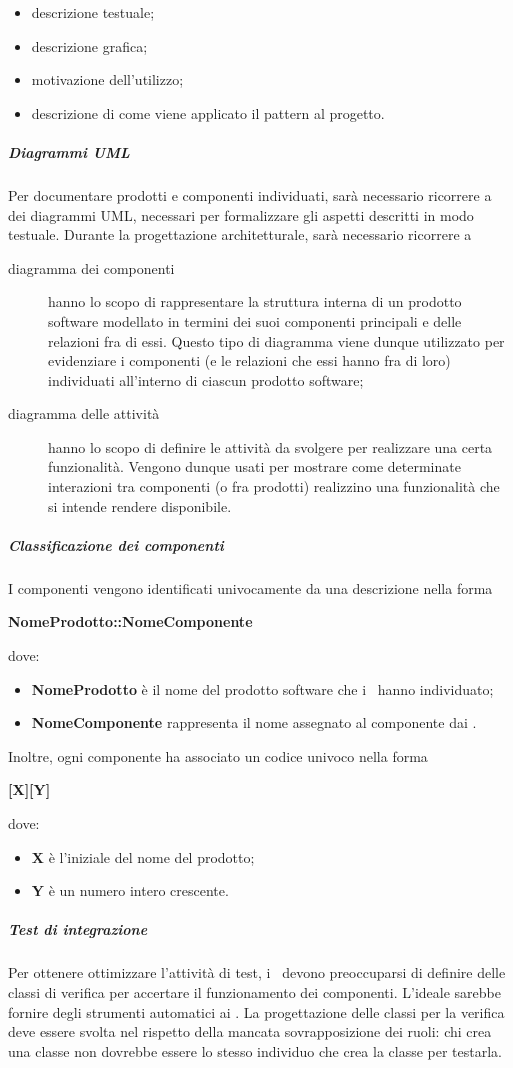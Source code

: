 \documentclass[../NormeProgetto.tex]{subfiles}
\begin{document}
				\begin{itemize}
					\item descrizione testuale;
					\item descrizione grafica;
					\item motivazione dell'utilizzo;
					\item descrizione di come viene applicato il pattern al progetto.
				\end{itemize}
			\subparagraph{Diagrammi UML}
				Per documentare prodotti e componenti individuati, sarà necessario ricorrere a dei diagrammi UML, necessari per formalizzare gli aspetti descritti in modo testuale. Durante la progettazione architetturale, sarà necessario ricorrere a 
				\begin{description}
					\item[diagramma dei componenti]  hanno lo scopo di rappresentare la struttura interna di un prodotto software modellato in termini dei suoi componenti principali e delle relazioni fra di essi. Questo tipo di diagramma viene dunque utilizzato per evidenziare i componenti (e le relazioni che essi hanno fra di loro) individuati all'interno di ciascun prodotto software;
					\item[diagramma delle attività]  hanno lo scopo di definire le attività da svolgere per realizzare una certa funzionalità. Vengono dunque usati per mostrare come determinate interazioni tra
componenti (o fra prodotti) realizzino una funzionalità che si intende rendere disponibile.
				\end{description}
			\subparagraph{Classificazione dei componenti}
				I componenti vengono identificati univocamente da una descrizione nella forma \begin{center}\textbf{NomeProdotto::NomeComponente}\end{center} dove:
				\begin{itemize}
					\item \textbf{NomeProdotto} è il nome del prodotto software che i \progettisti\ hanno individuato;
					\item \textbf{NomeComponente} rappresenta il nome assegnato al componente dai \progettisti.
				\end{itemize}
				Inoltre, ogni componente ha associato un codice univoco nella forma \begin{center}\textbf{[X][Y]}\end{center} dove:
				\begin{itemize}
					\item \textbf{X} è l'iniziale del nome del prodotto;
					\item \textbf{Y} è un numero intero crescente.
				\end{itemize}
			\subparagraph{Test di integrazione}
				Per ottenere ottimizzare l'attività di test, i \progettisti\ devono preoccuparsi di definire delle classi di verifica per accertare il funzionamento dei componenti. L'ideale sarebbe fornire degli strumenti automatici ai \verificatori . La progettazione delle classi per la verifica deve essere svolta nel rispetto della mancata sovrapposizione dei ruoli: chi crea una classe non dovrebbe essere lo stesso individuo che crea la classe per testarla.
\end{document}

